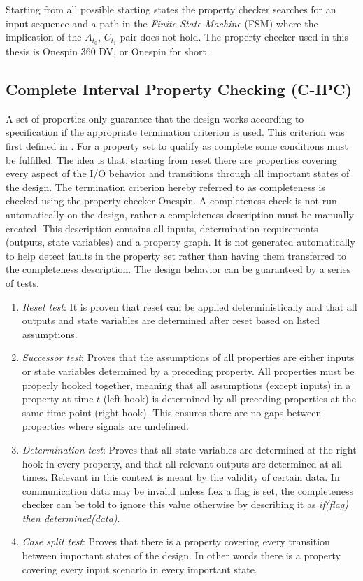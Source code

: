 Starting from all possible starting states the property checker searches for an input sequence and a path in the \textit{Finite State Machine} (FSM) where the implication of the $A_{t_0}$, $C_{t_1}$ pair does not hold. The property checker used in this thesis is Onespin 360 DV, or Onespin for short \cite{onespin}. 

\subsection{Complete Interval Property Checking (C-IPC)}
\label{subsec:cipc}
A set of properties only guarantee that the design works according to specification if the appropriate termination criterion is used. This criterion was first defined in \cite{bormannbusch}. For a property set to qualify as complete some conditions must be fulfilled. The idea is that, starting from reset there are properties covering every aspect of the I/O behavior and transitions through all important states of the design. The termination criterion hereby referred to as completeness is checked using the property checker Onespin.   A completeness check is not run automatically on the design, rather a completeness description must be manually created. This description contains all inputs, determination requirements (outputs, state variables) and a property graph. It is not generated automatically to help detect faults in the property set rather than having them transferred to the completeness description. The design behavior can be guaranteed by a series of tests.
\begin{enumerate}
 \item \textit{Reset test}: It is proven that reset can be applied deterministically and that all outputs and state variables are determined after reset based on listed assumptions.
 \item \textit{Successor test}: Proves that the assumptions of all properties are either inputs or state variables determined by a preceding property. All properties must be properly hooked together, meaning that all assumptions (except inputs) in a property at time $t$ (left hook) is determined by all preceding properties at the same time point (right hook). This ensures there are no gaps between properties where signals are undefined. 
 \item \textit{Determination test}: Proves that all state variables are determined at the right hook in every property, and that all relevant outputs are determined at all times. Relevant in this context is meant by the validity of certain data. In communication data may be invalid unless f.ex a flag is set, the completeness checker can be told to ignore this value otherwise by describing it as \textit{if(flag) then determined(data)}.
 \item \textit{Case split test}: Proves that there is a property covering every transition between important states of the design. In other words there is a property covering every input scenario in every important state. 
\end{enumerate}

